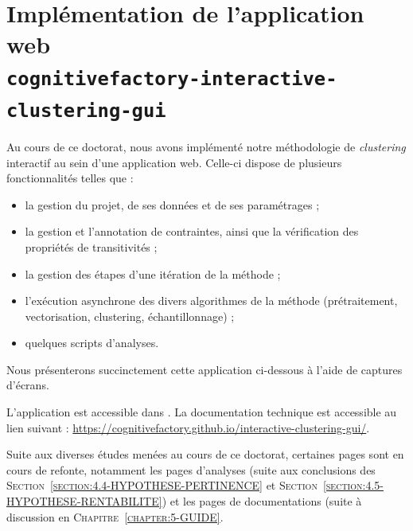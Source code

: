 \section{Implémentation de l'application web \\ \texttt{cognitivefactory-interactive-clustering-gui}}
\label{annex:C.4-DESCRIPTION-IMPLEMENTATION-INTERACTIVE-CLUSTERING-GUI}

	Au cours de ce doctorat, nous avons implémenté notre méthodologie de \textit{clustering} interactif au sein d'une application web.
	Celle-ci dispose de plusieurs fonctionnalités telles que :
	\begin{itemize}
		\item la gestion du projet, de ses données et de ses paramétrages ;
		\item la gestion et l'annotation de contraintes, ainsi que la vérification des propriétés de transitivités ;
		\item la gestion des étapes d'une itération de la méthode ;
		\item l'exécution asynchrone des divers algorithmes de la méthode (prétraitement, vectorisation, clustering, échantillonnage) ;
		\item quelques scripts d'analyses.
	\end{itemize}
	
	Nous présenterons succinctement cette application ci-dessous à l'aide de captures d'écrans.
	
	\begin{leftBarInformation}
		L'application est accessible dans \cite{schild-etal:2022:cognitivefactory-interactiveclusteringgui}.
		La documentation technique est accessible au lien suivant : \url{https://cognitivefactory.github.io/interactive-clustering-gui/}.
	\end{leftBarInformation}
	
	\begin{leftBarAuthorOpinion}
		Suite aux diverses études menées au cours de ce doctorat, certaines pages sont en cours de refonte, notamment les pages d'analyses (suite aux conclusions des \textsc{Section~\ref{section:4.4-HYPOTHESE-PERTINENCE}} et \textsc{Section~\ref{section:4.5-HYPOTHESE-RENTABILITE}}) et les pages de documentations (suite à discussion en \textsc{Chapitre~\ref{chapter:5-GUIDE}}.
	\end{leftBarAuthorOpinion}
	
